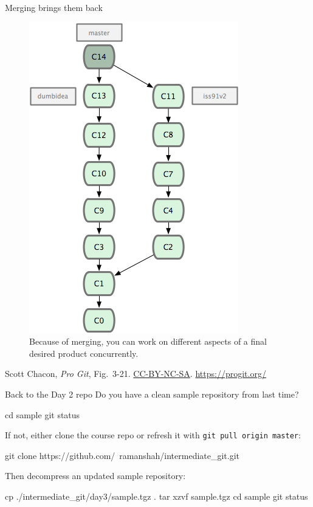 \begin{frame}{Merging brings them back}
  \begin{figure}
    \includegraphics[scale=0.8]{18333fig0321-tn.png}
    \\ Because of merging, you can work on different aspects of a final desired product concurrently.
  \end{figure}
  \footnotesize{Scott Chacon,
    \emph{Pro Git},
    Fig.~3-21.
    \href{https://creativecommons.org/licenses/by-nc-sa/3.0/legalcode}{CC-BY-NC-SA}.
    \href{https://progit.org/}{https://progit.org/}}
\end{frame}

\begin{frame}[fragile]{Back to the Day 2 repo}
  Do you have a clean sample repository from last time?

  \begin{gitCommand}
cd sample
git status
  \end{gitCommand}

  If not, either clone the course repo or refresh it with
  \texttt{git pull origin master}:

  \begin{gitCommand}
git clone https://github.com/\
ramanshah/intermediate_git.git
  \end{gitCommand}

  Then decompress an updated sample repository:

  \begin{gitCommand}
cp ./intermediate_git/day3/sample.tgz .
tar xzvf sample.tgz
cd sample
git status
  \end{gitCommand}
\end{frame}

